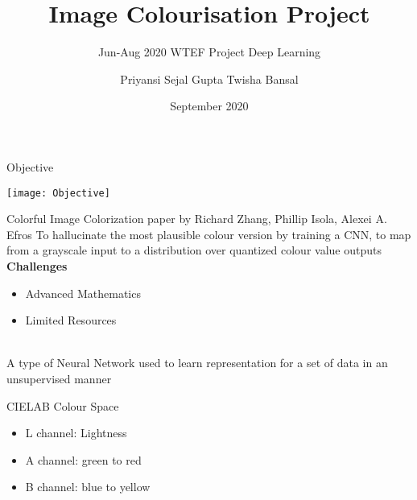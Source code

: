 \documentclass[12pt]{beamer}
\title[Image-Colourization]{Image Colourisation Project}
\subtitle{Jun-Aug 2020 {\textbar} WTEF Project {\textbar} Deep Learning}
\author[Team-9]{Priyansi {\textbar} Sejal Gupta {\textbar} Twisha Bansal}
\date{September 2020}
\begin{document}
\begin{frame}
        \titlepage
\end{frame}

\begin{frame}[standout]
\end{frame}

\begin{frame}{Objective}
	\begin{center}
		\texttt{[image: Objective]}
	\end{center}
\end{frame}

\begin{frame}{Colorful Image Colorization paper by Richard Zhang, Phillip Isola, Alexei A. Efros}
	To hallucinate the most plausible colour version by training a CNN, to map from a grayscale input to a distribution over quantized colour value outputs\\
	\pause
	\textbf{Challenges}\\
	\begin{itemize}
		\item Advanced Mathematics
		\item Limited Resources
	\end{itemize}
\end{frame}

\begin{frame}[standout]
	\\
	A type of Neural Network used to learn representation for a set of data in an unsupervised manner
\end{frame}

\begin{frame}{CIELAB Colour Space}
	\begin{itemize}
		\item L channel: Lightness
		\item A channel: green to red
		\item B channel: blue to yellow
	\end{itemize}
\end{frame}
\end{document}
